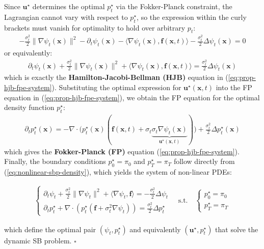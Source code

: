 \documentclass{article}
\begin{document}
Since $\boldsymbol{u}^\star$ determines the optimal $p^\star_t$ via the Fokker-Planck constraint, the Lagrangian cannot vary with respect to $p^\star_t$, so the expression within the curly brackets must vanish for optimality to hold over arbitrary $p_t$:
\begin{align}
    -\frac{\sigma_t^2}{2}\|\nabla \psi_t(\boldsymbol{x})\|^2-\partial_t\psi_t(\boldsymbol{x})-\langle\nabla \psi_t (\boldsymbol{x}), \boldsymbol{f}(\boldsymbol{x},t)\rangle-\frac{\sigma_t^2}{2}\Delta \psi_t (\boldsymbol{x})=0
\end{align}
or equivalently:
\begin{align}
    \partial_t\psi_t(\boldsymbol{x})+\frac{\sigma_t^2}{2}\|\nabla \psi_t(\boldsymbol{x})\|^2+\langle\nabla \psi_t (\boldsymbol{x}), \boldsymbol{f}(\boldsymbol{x},t)\rangle=\frac{\sigma_t^2}{2}\Delta \psi_t (\boldsymbol{x})\label{eq:hjb-pde}
\end{align}
which is exactly the \textbf{Hamilton-Jacobi-Bellman (HJB)} equation in (\ref{eq:prop-hjb-fpe-system}). Substituting the optimal expression for $\boldsymbol{u}^\star(\boldsymbol{x},t)$ into the FP equation in (\ref{eq:prop-hjb-fpe-system}), we obtain the FP equation for the optimal density function $p^\star_t$:
\begin{align}
    \partial_tp^\star_t(\boldsymbol{x})=-\nabla\cdot\big(p^\star_t(\boldsymbol{x})(\boldsymbol{f}(\boldsymbol{x},t) +\sigma_t\underbrace{\sigma_t\nabla \psi_t(\boldsymbol{x})}_{\boldsymbol{u}^\star(\boldsymbol{x},t )})\big)+\frac{\sigma_t^2}{2}\Delta p^\star_t(\boldsymbol{x})
\end{align}
which gives the \textbf{Fokker-Planck (FP)} equation (\ref{eq:prop-hjb-fpe-system}). Finally, the boundary conditions $p^\star_0=\pi_0$ and $p^\star_T=\pi_T$ follow directly from (\ref{eq:nonlinear-sbp-density}), which yields the system of non-linear PDEs:
\begin{small}
\begin{align}
    \boxed{\begin{cases}
        \partial_t\psi_t+\frac{\sigma_t^2}{2}\|\nabla\psi_t\|^2+\langle\nabla\psi_t, \boldsymbol{f}\rangle=-\frac{\sigma^2_t}{2}\Delta \psi_t\\
        \partial_t p_t^\star+\nabla\cdot (p_t^\star(\boldsymbol{f}+\sigma^2_t\nabla \psi_t))=\frac{\sigma^2_t}{2}\Delta p^\star_t
    \end{cases}\quad \text{s.t.}\quad \begin{cases}
        p^\star_0=\pi_0\\
        p^\star_T=\pi_T
    \end{cases}}\tag{HJB-FP System}
\end{align}
\end{small}
which define the optimal pair $(\psi_t,p^\star_t)$ and equivalently $(\boldsymbol{u}^\star, p_t^\star)$ that solve the dynamic SB problem. \hfill $\square$
\end{document}
